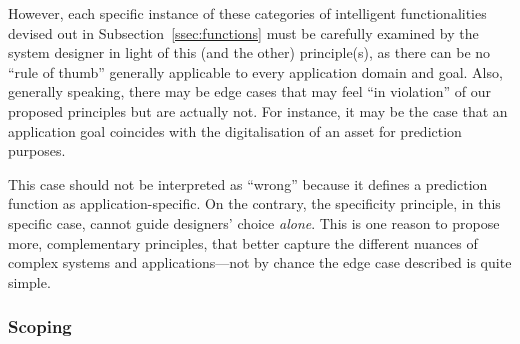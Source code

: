 However, each specific instance of these categories of intelligent functionalities devised out in Subsection~\ref{ssec:functions} must be carefully examined by the system designer in light of this (and the other) principle(s), as there can be no ``rule of thumb'' generally applicable to every application domain and goal. 
%
%
%
%
Also, generally speaking, there may be edge cases that may feel ``in violation'' of our proposed principles but are actually not.  
For instance, it may be the case that an application goal coincides with the digitalisation of an asset for prediction purposes. 

This case should not be interpreted as ``wrong'' because it defines a prediction function as application-specific. 
On the contrary, the specificity principle, in this specific case, cannot guide designers' choice \emph{alone}. 
This is one reason to propose more, complementary principles, that better capture the different nuances of complex systems and applications---not by chance the edge case described is quite simple. 

\subsubsection{Scoping} %


